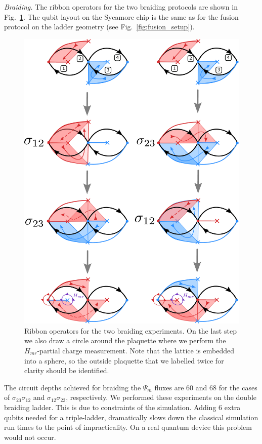 \documentclass[a4paper,twocolumn,11pt]{quantumarticle}
\begin{document}
\emph{Braiding.} The ribbon operators for the two braiding protocols are shown in Fig.~\ref{fig:braiding_setup}. The qubit layout on the Sycamore chip is the same as for the fusion protocol on the ladder geometry (see Fig.~\ref{fig:fusion_setup}).
\begin{figure}
	\centering
	\includegraphics[width=\linewidth]{Figures/braiding_setup.pdf}
	\caption{Ribbon operators for the two braiding experiments. On the last step we also draw a circle around the plaquette where we perform the $H_{mr}$-partial charge measurement. Note that the lattice is embedded into a sphere, so the outside plaquette that we labelled twice for clarity should be identified.}
	\label{fig:braiding_setup}
\end{figure}


The circuit depths achieved for braiding the $\Psi_m$ fluxes are 60 and 68 for the cases of $\sigma_{23}\sigma_{12}$ and $\sigma_{12}\sigma_{23}$, respectively. We performed these experiments on the double braiding ladder. This is due to constraints of the simulation. Adding 6 extra qubits needed for a triple-ladder, dramatically slows down the classical simulation run times to the point of impracticality. On a real quantum device this problem would not occur.
\end{document}
